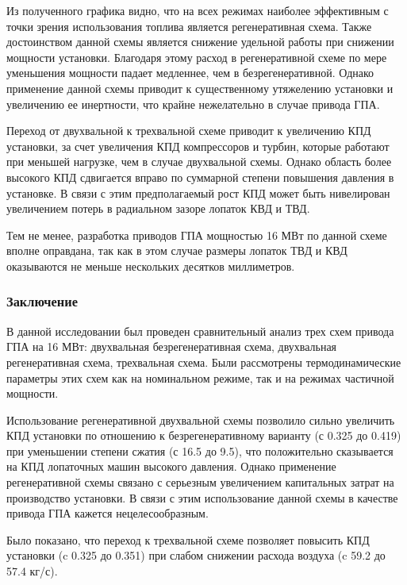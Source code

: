 Из полученного графика видно, что на всех режимах наиболее эффективным с точки зрения использования топлива является регенеративная схема. Также достоинством данной схемы является снижение удельной работы при снижении мощности установки. Благодаря этому расход в регенеративной схеме по мере уменьшения мощности падает медленнее, чем в безрегенеративной. Однако применение данной схемы приводит к существенному утяжелению установки и увеличению ее инертности, что крайне нежелательно в случае привода ГПА.

Переход от двухвальной к трехвальной схеме приводит к увеличению КПД установки, за счет увеличения КПД компрессоров и турбин, которые работают при меньшей нагрузке, чем в случае двухвальной схемы. Однако область более высокого КПД сдвигается вправо по суммарной степени повышения давления в установке. В связи с этим предполагаемый рост КПД может быть нивелирован увеличением потерь в радиальном зазоре лопаток КВД и ТВД.

Тем не менее, разработка приводов ГПА мощностью 16 МВт по данной схеме вполне оправдана, так как в этом случае размеры лопаток ТВД и КВД оказываются не меньше нескольких десятков миллиметров.


\subsubsection{Заключение}

В данной исследовании был проведен сравнительный анализ трех схем привода ГПА на 16 МВт: двухвальная безрегенеративная схема, двухвальная регенеративная схема, трехвальная схема. Были рассмотрены термодинамические параметры этих схем как на номинальном режиме, так и на режимах частичной мощности.

Использование регенеративной двухвальной схемы позволило сильно увеличить КПД установки по отношению к безрегенеративному варианту (с 0.325 до 0.419) при уменьшении степени сжатия (с 16.5 до 9.5), что положительно сказывается на КПД лопаточных машин высокого давления. Однако применение регенеративной схемы связано с серьезным увеличением капитальных затрат на производство установки. В связи с этим использование данной схемы в качестве привода ГПА кажется нецелесообразным.

Было показано, что переход к трехвальной схеме позволяет повысить КПД установки (c 0.325 до 0.351) при слабом снижении расхода воздуха (c 59.2 до 57.4 кг/с).

